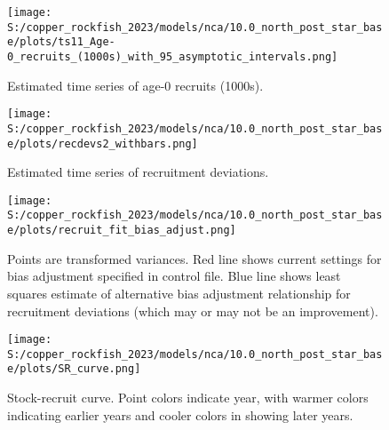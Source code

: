 \documentclass[11pt,
  letterpaper,
]{article}
\begin{document}
\begin{figure}
{\centering
\texttt{[image: S:/copper\_rockfish\_2023/models/nca/10.0\_north\_post\_star\_base/plots/ts11\_Age-0\_recruits\_(1000s)\_with\_95\_asymptotic\_intervals.png]}
}
\caption{Estimated time series of age-0 recruits (1000s).\label{fig:recruits}}
\end{figure}

\pagebreak

\begin{figure}
{\centering
\texttt{[image: S:/copper\_rockfish\_2023/models/nca/10.0\_north\_post\_star\_base/plots/recdevs2\_withbars.png]}
}
\caption{Estimated time series of recruitment deviations.\label{fig:rec-devs}}
\end{figure}

\pagebreak

\begin{figure}
{\centering
\texttt{[image: S:/copper\_rockfish\_2023/models/nca/10.0\_north\_post\_star\_base/plots/recruit\_fit\_bias\_adjust.png]}
}
\caption{Points are transformed variances. Red line shows current settings for bias adjustment specified in control file. Blue line shows least squares estimate of alternative bias adjustment relationship for recruitment deviations (which may or may not be an improvement).\label{fig:bias-adjust}}
\end{figure}

\newpage

\begin{figure}
{\centering
\texttt{[image: S:/copper\_rockfish\_2023/models/nca/10.0\_north\_post\_star\_base/plots/SR\_curve.png]}
}
\caption{Stock-recruit curve. Point colors indicate year, with warmer colors indicating earlier years and cooler colors in showing later years.\label{fig:bh-curve}}
\end{figure}
\end{document}
